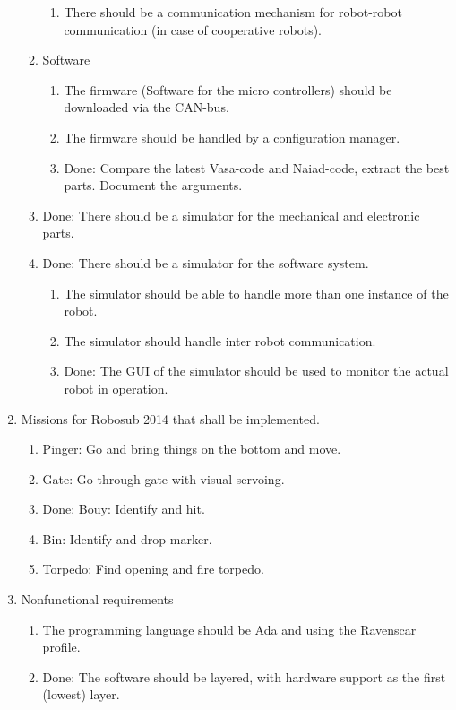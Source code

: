\begin{enumerate}
\begin{enumerate}
\begin{enumerate}
\item {\color{red} There should be a communication mechanism for robot-robot communication (in case of cooperative robots).}
\end{enumerate}
\item Software
\begin{enumerate}
\item The firmware (Software for the micro controllers) should be downloaded via the CAN-bus.
\item The firmware should be handled by a configuration manager.
\item {\color{green}Done: Compare the latest Vasa-code and Naiad-code, extract the best parts. Document the arguments.}
\end{enumerate}
\item {\color{green}Done: There should be a simulator for the mechanical and electronic parts.}
\item {\color{green}Done: There should be a simulator for the software system.}
\begin{enumerate}
\item {\color{red} The simulator should be able to handle more than one instance of the robot.}
\item {\color{red} The simulator should handle inter robot communication.} 
\item {\color{green}Done: The GUI of the simulator should be used to monitor the actual robot in operation.}
\end{enumerate}
\end{enumerate}
\item Missions for Robosub 2014 that shall be implemented.
\begin{enumerate}
\item Pinger: Go and bring things on the bottom and move.
\item Gate: Go through gate with visual servoing. 
\item {\color{green}Done: Bouy: Identify and hit.}
\item Bin: Identify and drop marker.
\item Torpedo: Find opening and fire torpedo.
\end{enumerate}
\item Nonfunctional requirements
\begin{enumerate}
\item {\color{red} The programming language should be Ada and using the Ravenscar profile.}
\item {\color{green}Done: The software should be layered, with hardware support as the first (lowest) layer.} 

\end{enumerate}
\end{enumerate}
